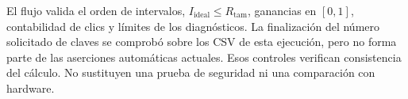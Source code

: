 El flujo valida el orden de intervalos, \(I_\mathrm{ideal}\leq R_\mathrm{tam}\), ganancias en \([0,1]\), contabilidad de clics y límites de los diagnósticos. La finalización del número solicitado de claves se comprobó sobre los CSV de esta ejecución, pero no forma parte de las aserciones automáticas actuales. Esos controles verifican consistencia del cálculo. No sustituyen una prueba de seguridad ni una comparación con hardware.
